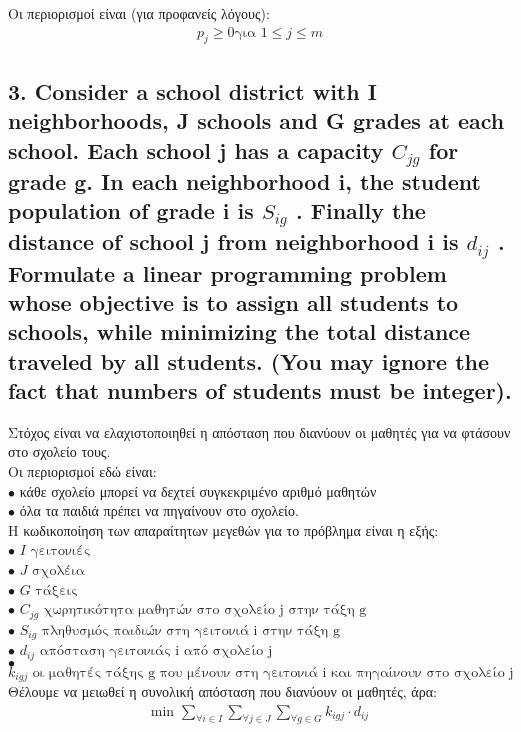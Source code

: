 \documentclass[12pt]{article}
\newcommand{\centered}[1]{\begin{align*}#1\end{align*}}
\begin{document}
Οι περιορισμοί είναι (για προφανείς λόγους): \\
\centered{p_{j} \geq 0 \mbox{για } 1 \leq j \leq m}

\vspace{2in}

\pagebreak

\subsection*{3. Consider a school district with I neighborhoods, J schools and G grades
	at each school. Each school j has a capacity \(C_{jg}\) for grade g. In each neighborhood i, the
	student population of grade i is \(S_{ig}\) . Finally the distance of school j from neighborhood i is \(d_{ij}\) .
	Formulate a linear programming problem whose objective is to assign all students to schools,
	while minimizing the total distance traveled by all students. (You may ignore the fact that
	numbers of students must be integer).}

Στόχος είναι να ελαχιστοποιηθεί η απόσταση που διανύουν οι μαθητές για να φτάσουν στο σχολείο τους. \\

Οι περιορισμοί εδώ είναι: \\
\( \bullet \) κάθε σχολείο μπορεί να δεχτεί συγκεκριμένο αριθμό μαθητών \\
\( \bullet \) όλα τα παιδιά πρέπει να πηγαίνουν στο σχολείο. \\

Η κωδικοποίηση των απαραίτητων μεγεθών για το πρόβλημα είναι η εξής: \\
\( \bullet \) \( I \mbox{ γειτονιές}\) \\
\(\bullet \) \( J \mbox{ σχολέια}\) \\
\(\bullet \) \( G \mbox{ τάξεις}\) \\
\(\bullet \) \( C_{jg} \mbox{ χωρητικότητα μαθητών στο σχολείο j στην τάξη g}\) \\
\(\bullet \) \( S_{ig} \mbox{ πληθυσμός παιδιών στη γειτονιά i στην τάξη g}\) \\
\(\bullet \) \( d_{ij} \mbox{ απόσταση γειτονιάς i από σχολείο j}\) \\
\(\bullet \) \( k_{igj} \mbox{ οι μαθητές τάξης g που μένουν στη γειτονιά i και πηγαίνουν στο σχολείο j}\) \\

Θέλουμε να μειωθεί η συνολική απόσταση που διανύουν οι μαθητές, άρα: \\
\centered{\mbox{min } \sum_{\forall i \in I}{ \sum_{\forall j \in J} { \sum_{\forall g \in G} {k_{igj} \cdot d_{ij} } }  }    }
\end{document}
